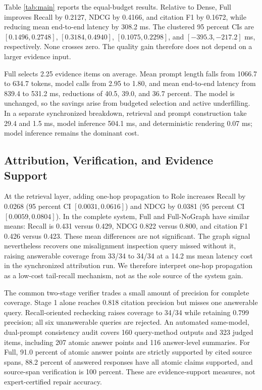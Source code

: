 \documentclass[conference]{IEEEtran}
\begin{document}
Table \ref{tab:main} reports the equal-budget results. Relative to Dense, Full improves Recall by 0.2127, NDCG by 0.4166, and citation F1 by 0.1672, while reducing mean end-to-end latency by 308.2 ms. The clustered 95 percent CIs are $[0.1496,0.2748]$, $[0.3184,0.4940]$, $[0.1075,0.2298]$, and $[-395.3,-217.2]$ ms, respectively. None crosses zero. The quality gain therefore does not depend on a larger evidence input.

Full selects 2.25 evidence items on average. Mean prompt length falls from 1066.7 to 634.7 tokens, model calls from 2.95 to 1.80, and mean end-to-end latency from 839.4 to 531.2 ms, reductions of 40.5, 39.0, and 36.7 percent. The model is unchanged, so the savings arise from budgeted selection and active underfilling. In a separate synchronized breakdown, retrieval and prompt construction take 29.4 and 1.5 ms, model inference 504.1 ms, and deterministic rendering 0.07 ms; model inference remains the dominant cost.

\subsection{Attribution, Verification, and Evidence Support}

At the retrieval layer, adding one-hop propagation to Role increases Recall by 0.0268 (95 percent CI $[0.0031,0.0616]$) and NDCG by 0.0381 (95 percent CI $[0.0059,0.0804]$). In the complete system, Full and Full-NoGraph have similar means: Recall is 0.431 versus 0.429, NDCG 0.822 versus 0.800, and citation F1 0.426 versus 0.423. These mean differences are not significant. The graph signal nevertheless recovers one misalignment inspection query missed without it, raising answerable coverage from 33/34 to 34/34 at a 14.2 ms mean latency cost in the synchronized attribution run. We therefore interpret one-hop propagation as a low-cost tail-recall mechanism, not as the sole source of the system gain.

The common two-stage verifier trades a small amount of precision for complete coverage. Stage 1 alone reaches 0.818 citation precision but misses one answerable query. Recall-oriented rechecking raises coverage to 34/34 while retaining 0.799 precision; all six unanswerable queries are rejected. An automated same-model, dual-prompt consistency audit covers 160 query-method outputs and 323 judged items, including 207 atomic answer points and 116 answer-level summaries. For Full, 91.0 percent of atomic answer points are strictly supported by cited source spans, 88.2 percent of answered responses have all atomic claims supported, and source-span verification is 100 percent. These are evidence-support measures, not expert-certified repair accuracy.
\end{document}
